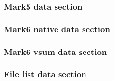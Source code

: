 \documentclass[12pt]{article}
\begin{document}
\subsubsection{Mark5 data section}

\subsubsection{Mark6 native data section}

\subsubsection{Mark6 vsum data section}

\subsubsection{File list data section}
\end{document}
